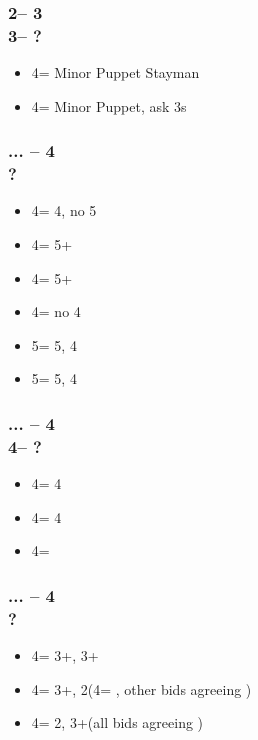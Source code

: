 \documentclass[12pt, a4paper]{report}
\begin{document}
{    \subsubsection*{2\nt -- 3\hearts\\
                    3\spades -- ?}
    \begin{itemize}
        \item 4\clubs = Minor Puppet Stayman
        \item 4\diams = Minor Puppet, ask 3s
    \end{itemize}

    \subsubsection*{... -- 4\clubs\\
                    ?}
    \begin{itemize}
        \item 4\diams = 4\minor, no 5\minor
        \item 4\hearts = 5+\clubs
        \item 4\spades = 5+\diams
        \item 4\nt = no 4\minor
        \item 5\clubs = 5\clubs, 4\diams
        \item 5\diams = 5\diams, 4\clubs
    \end{itemize}

    \subsubsection*{... -- 4\clubs\\
                    4\diams -- ?}
    \begin{itemize}
        \item 4\hearts = 4\clubs
        \item 4\spades = 4\diams
        \item 4\nt = \soff
    \end{itemize}

    \subsubsection*{... -- 4\diams\\
                    ?}
    \begin{itemize}
        \item 4\hearts = 3+\clubs, 3+\diams
        \item 4\spades = 3+\clubs, 2\diams (4\nt = \soff, other bids agreeing \clubs)
        \item 4\nt = 2\clubs, 3+\diams (all bids agreeing \diams)
    \end{itemize}

}
\end{document}

